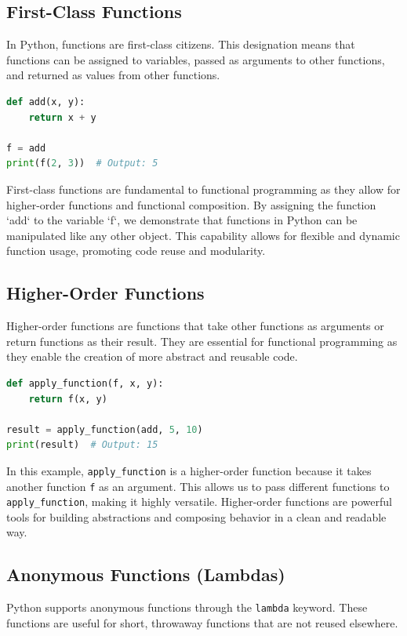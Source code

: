 \documentclass[a4paper]{article}
\begin{document}
\subsection{First-Class Functions}
In Python, functions are first-class citizens. This designation means that functions can be assigned to variables, passed as arguments to other functions, and returned as values from other functions.\\

\begin{lstlisting}[language=Python, caption=First-Class Functions]
def add(x, y):
    return x + y

f = add
print(f(2, 3))  # Output: 5
\end{lstlisting}

First-class functions are fundamental to functional programming as they allow for higher-order functions and functional composition. By assigning the function `add` to the variable `f`, we demonstrate that functions in Python can be manipulated like any other object. This capability allows for flexible and dynamic function usage, promoting code reuse and modularity.\\

\subsection{Higher-Order Functions}
Higher-order functions are functions that take other functions as arguments or return functions as their result. They are essential for functional programming as they enable the creation of more abstract and reusable code.\\

\begin{lstlisting}[language=Python, caption=Higher-Order Functions]
def apply_function(f, x, y):
    return f(x, y)

result = apply_function(add, 5, 10)
print(result)  # Output: 15
\end{lstlisting}

In this example, \texttt{apply\_function} is a higher-order function because it takes another function \texttt{f} as an argument. This allows us to pass different functions to \texttt{apply\_function}, making it highly versatile. Higher-order functions are powerful tools for building abstractions and composing behavior in a clean and readable way.\\

\subsection{Anonymous Functions (Lambdas)}
Python supports anonymous functions through the \texttt{lambda} keyword. These functions are useful for short, throwaway functions that are not reused elsewhere.\\
\end{document}
